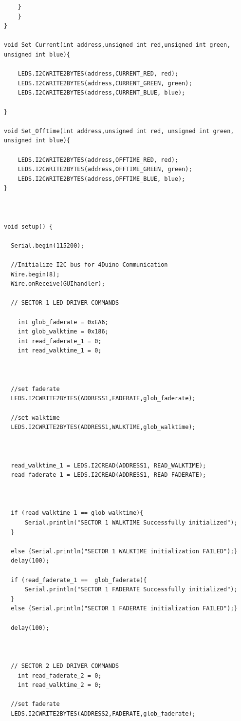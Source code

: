 \documentclass[12pt,a4paper]{report}
\begin{document}
\begin{lstlisting}
    }
    }
}

void Set_Current(int address,unsigned int red,unsigned int green, unsigned int blue){

    LEDS.I2CWRITE2BYTES(address,CURRENT_RED, red);
    LEDS.I2CWRITE2BYTES(address,CURRENT_GREEN, green);
    LEDS.I2CWRITE2BYTES(address,CURRENT_BLUE, blue);

}

void Set_Offtime(int address,unsigned int red, unsigned int green, unsigned int blue){

    LEDS.I2CWRITE2BYTES(address,OFFTIME_RED, red);
    LEDS.I2CWRITE2BYTES(address,OFFTIME_GREEN, green);
    LEDS.I2CWRITE2BYTES(address,OFFTIME_BLUE, blue);
}



void setup() {

  Serial.begin(115200);

  //Initialize I2C bus for 4Duino Communication
  Wire.begin(8);
  Wire.onReceive(GUIhandler);

  // SECTOR 1 LED DRIVER COMMANDS

    int glob_faderate = 0xEA6;
    int glob_walktime = 0x186;
    int read_faderate_1 = 0;
    int read_walktime_1 = 0;

    

  //set faderate
  LEDS.I2CWRITE2BYTES(ADDRESS1,FADERATE,glob_faderate); 

  //set walktime
  LEDS.I2CWRITE2BYTES(ADDRESS1,WALKTIME,glob_walktime);

    

  read_walktime_1 = LEDS.I2CREAD(ADDRESS1, READ_WALKTIME);
  read_faderate_1 = LEDS.I2CREAD(ADDRESS1, READ_FADERATE);



  if (read_walktime_1 == glob_walktime){
      Serial.println("SECTOR 1 WALKTIME Successfully initialized");
  }

  else {Serial.println("SECTOR 1 WALKTIME initialization FAILED");}
  delay(100);

  if (read_faderate_1 ==  glob_faderate){
      Serial.println("SECTOR 1 FADERATE Successfully initialized");
  }
  else {Serial.println("SECTOR 1 FADERATE initialization FAILED");} 

  delay(100);

  

  // SECTOR 2 LED DRIVER COMMANDS
    int read_faderate_2 = 0;
    int read_walktime_2 = 0;

  //set faderate
  LEDS.I2CWRITE2BYTES(ADDRESS2,FADERATE,glob_faderate); 


\end{lstlisting}
\end{document}
